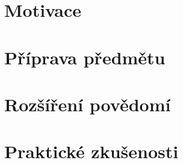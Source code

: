 
\section{Motivace}
\section{Příprava předmětu}
\section{Rozšíření povědomí}
\section{Praktické zkušenosti}
